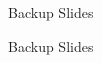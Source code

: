 \documentclass[10pt]{beamer}
\begin{document}
\begin{frame}{Backup Slides}

	\begin{center}
			\Huge{\alert{Backup Slides}}
	\end{center}

\end{frame}

%	
%	
%	
%
%
%	
%
\end{document}
